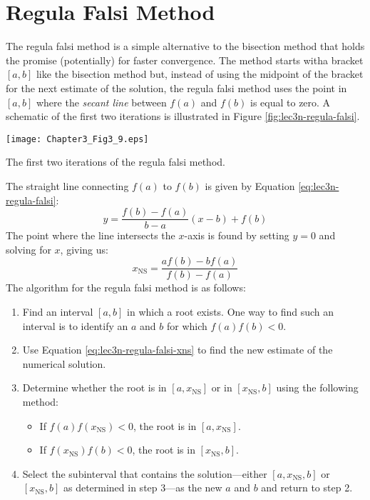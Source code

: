 \section{Regula Falsi Method}
The regula falsi method is a simple alternative to the bisection method that holds the promise (potentially) for faster convergence.  The method starts witha bracket $[a,b]$ like the bisection method but, instead of using the midpoint of the bracket for the next estimate of the solution, the regula falsi method uses the point in $[a,b]$ where the \emph{secant line} between $f(a)$ and $f(b)$ is equal to zero.  A schematic of the first two iterations is illustrated in Figure \ref{fig:lec3n-regula-falsi}.
\begin{marginfigure}
\texttt{[image: Chapter3\_Fig3\_9.eps]}
\caption{The first two iterations of the regula falsi method.}
\label{fig:lec3n-regula-falsi}
\end{marginfigure}
The straight line connecting $f(a)$ to $f(b)$ is given by Equation \ref{eq:lec3n-regula-falsi}:
\begin{equation}
y = \frac{f(b) - f(a)}{b-a}(x-b)+f(b)
\label{eq:lec3n-regula-falsi}
\end{equation}
The point where the line intersects the $x$-axis is found by setting $y=0$ and solving for $x$, giving us:
\begin{equation}
x_{\text{NS}} = \frac{a f(b) - b f(a)}{f(b) - f(a)}
\label{eq:lec3n-regula-falsi-xns}
\end{equation}
The algorithm for the regula falsi method is as follows:
\begin{enumerate}
\item Find an interval $[a,b]$ in which a root exists.  One way to find such an interval is to identify an $a$ and $b$ for which $f(a)f(b)<0$.
\item Use Equation \ref{eq:lec3n-regula-falsi-xns} to find the new estimate of the numerical solution.
\item Determine whether the root is in $[a,x_{\text{NS}}]$ or in $[x_{\text{NS}},b]$ using the following method:
\begin{itemize}
\item If $f(a)f(x_{\text{NS}}) < 0$, the root is in $[a,x_{\text{NS}}]$.
\item If $f(x_{\text{NS}})f(b) < 0$, the root is in $[x_{\text{NS}},b]$.
\end{itemize}
\item Select the subinterval that contains the solution---either $[a,x_{\text{NS}},b]$ or $[x_{\text{NS}},b]$ as determined in step 3---as the new $a$ and $b$ and return to step 2.
\end{enumerate}
